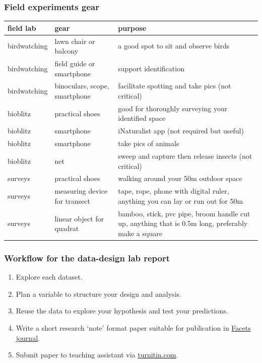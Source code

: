 \documentclass[
]{book}
\providecommand{\tightlist}{%
  \setlength{\itemsep}{0pt}\setlength{\parskip}{0pt}}
\begin{document}
\hypertarget{field-experiments-gear}{%
\subsubsection*{Field experiments gear}\label{field-experiments-gear}}

\begin{tabular}{lll}
\toprule
field lab & gear & purpose\\
\midrule
birdwatching & lawn chair or balcony & a good spot to sit and observe birds\\
birdwatching & field guide or smartphone & support identification\\
birdwatching & binoculars, scope, smartphone & facilitate spotting and take pics (not critical)\\
bioblitz & practical shoes & good for thoroughly surveying your identified space\\
bioblitz & smartphone & iNaturalist app (not required but useful)\\
\addlinespace
bioblitz & smartphone & take pics of animals\\
bioblitz & net & sweep and capture then release insects (not critical)\\
surveys & practical shoes & walking around your 50m outdoor space\\
surveys & measuring device for transect & tape, rope, phone with digital ruler, anything you can lay or run out for 50m\\
surveys & linear object for quadrat & bamboo, stick, pvc pipe, broom handle cut up, anything that is 0.5m long, preferably make a square\\
\bottomrule
\end{tabular}

\hypertarget{workflow-for-the-data-design-lab-report}{%
\subsubsection*{Workflow for the data-design lab report}\label{workflow-for-the-data-design-lab-report}}

\begin{enumerate}
\def\labelenumi{\arabic{enumi}.}
\tightlist
\item
  Explore each dataset.\\
\item
  Plan a variable to structure your design and analysis.\\
\item
  Reuse the data to explore your hypothesis and test your predictions.\\
\item
  Write a short research `note' format paper suitable for publication in \href{https://www.facetsjournal.com/authors/instructions/}{Facets journal}.\\
\item
  Submit paper to teaching assistant via \href{https://www.turnitin.com}{turnitin.com}.
\end{enumerate}
\end{document}
